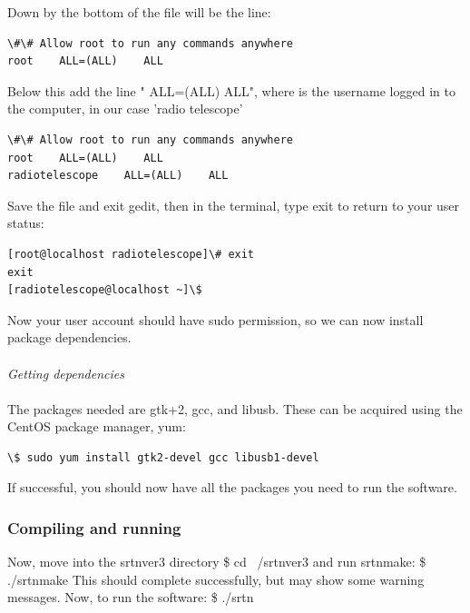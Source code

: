 \documentclass[11pt]{article} %
\begin{document}
Down by the bottom of the file will be the line:

\begin{verbatim}
\#\# Allow root to run any commands anywhere
root    ALL=(ALL)    ALL
\end{verbatim}

Below this add the line " ALL=(ALL) ALL", where is the username logged in to the computer, in our case 'radio telescope'

\begin{verbatim}
\#\# Allow root to run any commands anywhere
root    ALL=(ALL)    ALL
radiotelescope    ALL=(ALL)    ALL
\end{verbatim}

Save the file and exit gedit, then in the terminal, type exit to return to your user status:

\begin{verbatim}
[root@localhost radiotelescope]\# exit
exit
[radiotelescope@localhost ~]\$
\end{verbatim}

Now your user account should have sudo permission, so we can now install package dependencies.
\\ \\
\emph{Getting dependencies}
\\ \\
The packages needed are gtk+2, gcc, and libusb. These can be acquired using the CentOS package manager, yum:

\begin{verbatim}
\$ sudo yum install gtk2-devel gcc libusb1-devel
\end{verbatim}

If successful, you should now have all the packages you need to run the software.

\subsubsection{Compiling and running}

Now, move into the srtnver3 directory
\$ cd ~/srtnver3
and run srtnmake:
\$ ./srtnmake
This should complete successfully, but may show some warning messages. Now, to run the software:
\$ ./srtn
\end{document}
